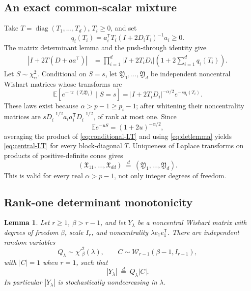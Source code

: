 \documentclass[11pt]{article}
\newtheorem{lemma}{Lemma}
\newcommand{\diag}{\operatorname{diag}}
\newcommand{\tr}{\operatorname{tr}}
\newcommand{\E}{\mathbb E}
\begin{document}
\subsection{An exact common-scalar mixture}

Take \(T=\diag(T_1,\ldots,T_d)\), \(T_i\geq0\), and set
\[
 q_i(T_i)=
 a_i^\mathsf T T_i(I+2D_iT_i)^{-1}a_i\geq0.
\]
The matrix determinant lemma and the push-through identity give
\begin{align}
 |I+2T(D+aa^\mathsf T)|
 &=
 \prod_{i=1}^d|I+2T_iD_i|
 \left(1+2\sum_{i=1}^d q_i(T_i)\right).\label{eq:detlemma}
\end{align}
Let \(S\sim\chi^2_\alpha\).  Conditional on \(S=s\), let
\(\mathfrak Y_1,\ldots,\mathfrak Y_d\) be independent noncentral Wishart
matrices whose transforms are
\begin{equation}\label{eq:conditional-LT}
 \E\!\left[e^{-\tr(T_i\mathfrak Y_i)}\mid S=s\right]
 =
 |I+2T_iD_i|^{-\alpha/2}e^{-s q_i(T_i)}.
\end{equation}
These laws exist because \(\alpha>p-1\geq p_i-1\); after whitening their
noncentrality matrices are
\(sD_i^{-1/2}a_i a_i^\mathsf T D_i^{-1/2}\), of rank at most one.
Since
\[
 \E e^{-uS}=(1+2u)^{-\alpha/2},
\]
averaging the product of \eqref{eq:conditional-LT} and using
\eqref{eq:detlemma} yields \eqref{eq:central-LT} for every block-diagonal
\(T\).  Uniqueness of Laplace transforms on products of positive-definite
cones gives
\begin{equation}\label{eq:mixture-law}
 (\mathfrak X_{11},\ldots,\mathfrak X_{dd})
 \ \stackrel d=\
 (\mathfrak Y_1,\ldots,\mathfrak Y_d).
\end{equation}
This is valid for every real \(\alpha>p-1\), not only integer degrees of
freedom.

\subsection{Rank-one determinant monotonicity}

\begin{lemma}\label{lem:rankone}
Let \(r\geq1\), \(\beta>r-1\), and let \(Y_\lambda\) be a noncentral
Wishart matrix with degrees of freedom \(\beta\), scale \(I_r\), and
noncentrality \(\lambda e_1e_1^\mathsf T\).  There are independent random
variables
\[
 Q_\lambda\sim\chi'^2_\beta(\lambda),
 \qquad C\sim\mathcal W_{r-1}(\beta-1,I_{r-1}),
\]
with \(|C|=1\) when \(r=1\), such that
\begin{equation}\label{eq:Bartlett}
 |Y_\lambda|\ \stackrel d=\ Q_\lambda |C|.
\end{equation}
In particular \(|Y_\lambda|\) is stochastically nondecreasing in
\(\lambda\).
\end{lemma}
\end{document}
